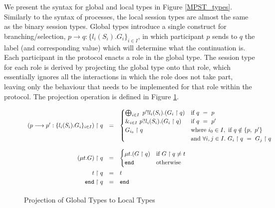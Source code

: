 \documentclass[12pt,twoside]{report}
\begin{document}
We present the syntax for global and local types in Figure \ref{MPST_types}. Similarly to the syntax of processes, the local session types are almost the same as the binary session types. Global types introduce a single construct for branching/selection, $p \longrightarrow q:\{l_i(S_i).G_i\}_{i \in I}$, in which participant $p$ sends to $q$ the label (and corresponding value) which will determine what the continuation is.\\

Each participant in the protocol enacts a role in the global type. The session type for each role is derived by projecting the global type onto that role, which essentially ignores all the interactions in which the role does not take part, leaving only the behaviour that needs to be implemented for that role within the protocol. The projection operation is defined in Figure \ref{MPST_projection}.\\

\begin{figure}[h]
    \centering
    \begin{equation*}
    \centering
    \begin{array}{rcl}
        
        (p \longrightarrow p':\{l_i(S_i).G_i\}_{i \in I}) \upharpoonright q & = &
        \begin{cases}
            \bigoplus_{i \in I}\ p'!l_i(S_i).(G_i \upharpoonright q) & \text{if}\ q\ =\ p\\
            \&_{i \in I}\ p?l_i(S_i).(G_i \upharpoonright q) & \text{if}\ q\ =\ p'\\
            G_{i_0} \upharpoonright q & \text{where}\ i_0 \in I,\ \text{if}\ q \notin \{p,\ p'\}\\
            & \text{and}\ \forall i,j \in I.\ G_i \upharpoonright q\ =\ G_j \upharpoonright q
        \end{cases}\\[33pt]
        (\mu t.G) \upharpoonright q & = & 
        \begin{cases}
            \mu t.(G \upharpoonright q) & \text{if}\ G \upharpoonright q \neq t\\
            \texttt{end} & \text{otherwise}
        \end{cases}\\[13pt]
        t \upharpoonright q & = & t\\[2.75pt]
        \texttt{end} \upharpoonright q & = & \texttt{end}\\[2.75pt]
        \end{array}
    \end{equation*}
    \caption{Projection of Global Types to Local Types}
    \label{MPST_projection}
\end{figure}{}
\end{document}
